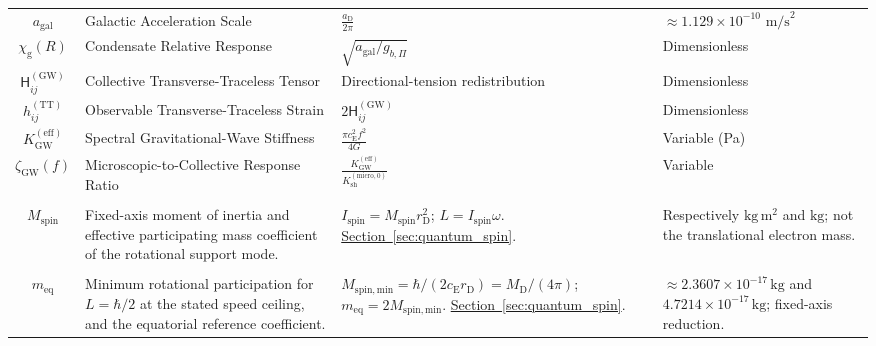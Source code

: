 \begin{longtable}{@{} c p{5.5cm} p{4cm} p{3.5cm} @{}}
$a_{\mathrm{gal}}$ & Galactic Acceleration Scale & $\frac{a_{\mathrm{D}}}{2\pi}$ & $\approx 1.129 \times 10^{-10} \text{ m/s}^2$ \\

$\chi_{\mathrm{g}}(R)$ & Condensate Relative Response & $\sqrt{a_{\mathrm{gal}} / g_{b,\Pi}}$ & Dimensionless \\

$\mathsf{H}_{ij}^{(\mathrm{GW})}$ & Collective Transverse-Traceless Tensor & Directional-tension redistribution & Dimensionless \\

$h_{ij}^{(\mathrm{TT})}$ & Observable Transverse-Traceless Strain & $2\mathsf{H}_{ij}^{(\mathrm{GW})}$ & Dimensionless \\

$K_{\mathrm{GW}}^{(\mathrm{eff})}$ & Spectral Gravitational-Wave Stiffness & $\frac{\pi c_{\mathrm{E}}^2 f^2}{4G}$ & Variable (Pa) \\

$\zeta_{\mathrm{GW}}(f)$ & Microscopic-to-Collective Response Ratio & $\frac{K_{\mathrm{GW}}^{(\mathrm{eff})}}{K_{\mathrm{sh}}^{(\mathrm{micro},0)}}$ & Variable \\

\begin{tabular}[c]{@{}c@{}}$I_{\mathrm{spin}}$ \\ $M_{\mathrm{spin}}$\end{tabular} & {\raggedright Fixed-axis moment of inertia and effective participating mass coefficient of the rotational support mode.\par} & {\raggedright $I_{\mathrm{spin}}=M_{\mathrm{spin}}r_{\mathrm D}^2$; $L=I_{\mathrm{spin}}\omega$. \newline \hyperref[sec:quantum_spin]{Section~\ref*{sec:quantum_spin}}.\par} & {\raggedright Respectively $\mathrm{kg\,m^2}$ and $\mathrm{kg}$; not the translational electron mass.\par} \\

\begin{tabular}[c]{@{}c@{}}$M_{\mathrm{spin,min}}$ \\ $m_{\mathrm{eq}}$\end{tabular} & {\raggedright Minimum rotational participation for $L=\hbar/2$ at the stated speed ceiling, and the equatorial reference coefficient.\par} & {\raggedright $M_{\mathrm{spin,min}}=\hbar/(2c_{\mathrm E}r_{\mathrm D})=M_{\mathrm D}/(4\pi)$; $m_{\mathrm{eq}}=2M_{\mathrm{spin,min}}$. \newline \hyperref[sec:quantum_spin]{Section~\ref*{sec:quantum_spin}}.\par} & {\raggedright $\approx2.3607\times10^{-17}\,\mathrm{kg}$ and $4.7214\times10^{-17}\,\mathrm{kg}$; fixed-axis reduction.\par} \\


\bottomrule
\end{longtable}

